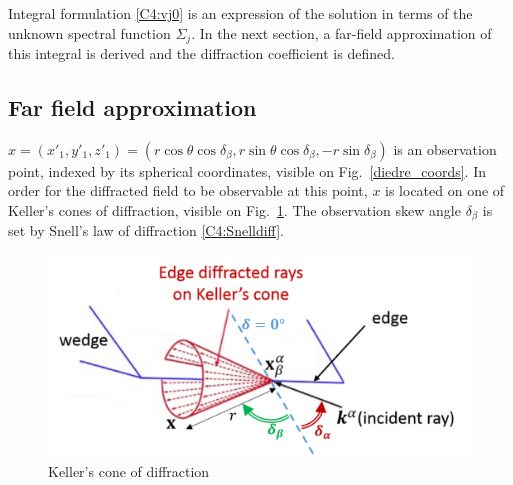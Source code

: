 Integral formulation \eqref{C4:vj0} is an expression of the solution in terms of the unknown spectral function $\Sigma_j$. In the next section, a far-field approximation of this integral is derived and the diffraction coefficient is defined.

\subsection{Far field approximation}
$x=(x'_1,y'_1,z'_1)=(r\cos\theta\cos\delta_{\beta},r\sin\theta\cos\delta_{\beta},-r\sin\delta_{\beta})$ is an observation point, indexed by its spherical coordinates, visible on Fig.~\ref{diedre_coords}. In order for the diffracted field to be observable at this point, $x$ is located on one of Keller's cones of diffraction, visible on Fig.~\ref{C4:Kellercone}. The observation skew angle $\delta_{\beta}$ is set by Snell's law of diffraction \eqref{C4:Snelldiff}.

\begin{figure}
\centering
\includegraphics[width=\textwidth]{images/chapter4/Keller_annotated.png}
        \caption{Keller's cone of diffraction}
        \label{C4:Kellercone}
\end{figure}

